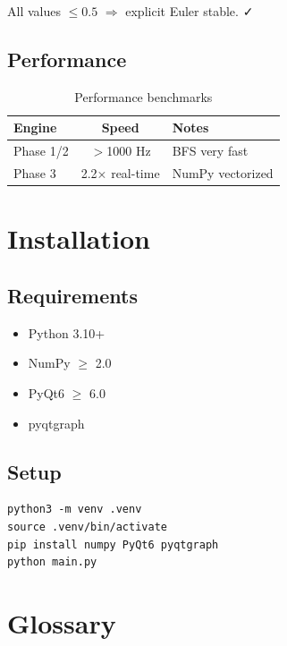 \documentclass[12pt,oneside,a4paper]{book}
\begin{document}
All values $\leq 0.5$ $\Rightarrow$ explicit Euler stable. ✓

\subsection{Performance}

\begin{table}[htb]
\centering
\begin{tabularx}{\textwidth}{|l|c|X|}
\hline
\textbf{Engine} & \textbf{Speed} & \textbf{Notes} \\
\hline
Phase 1/2 & $>$1000 Hz & BFS very fast \\
Phase 3 & 2.2× real-time & NumPy vectorized \\
\hline
\end{tabularx}
\caption{Performance benchmarks}
\label{tab:perf}
\end{table}

\section{Installation}

\subsection{Requirements}
\begin{itemize}
  \item Python 3.10+
  \item NumPy $\geq$ 2.0
  \item PyQt6 $\geq$ 6.0
  \item pyqtgraph
\end{itemize}

\subsection{Setup}
\begin{lstlisting}
python3 -m venv .venv
source .venv/bin/activate
pip install numpy PyQt6 pyqtgraph
python main.py
\end{lstlisting}

\section{Glossary}
\end{document}
